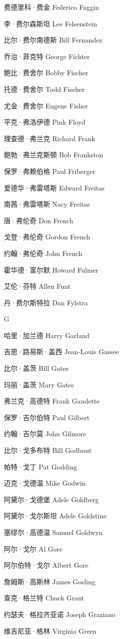 \documentclass[12pt,UTF8]{ctexbook}
\begin{document}
费德里科·费金 Federico Faggin

李·费尔森斯坦 Lee Felsenstein

比尔·费尔南德斯 Bill Fernandez

乔治·菲克特 George Fichter

鲍比·费舍尔 Bobby Fischer

托德·费舍尔 Todd Fischer

尤金·费舍尔 Eugene Fisher

平克·弗洛伊德 Pink Floyd

理查德·弗兰克 Richard Frank

鲍勃·弗兰克斯顿 Bob Frankston

保罗·弗赖伯格 Paul Friberger

爱德华·弗雷塔斯 Edward Freitas

南茜·弗雷塔斯 Nacy Freitas

唐·弗伦奇 Don French

戈登·弗伦奇 Gordon French

约翰·弗伦奇 John French

霍华德·富尔默 Howard Fulmer

艾伦·芬特 Allen Funt

丹·费尔斯特拉 Dan Fylstra

G

哈里·加兰德 Harry Garland

吉恩·路易斯·盖西 Jean-Louis Gassee

比尔·盖茨 Bill Gates

玛丽·盖茨 Mary Gates

弗兰克·高德特 Frank Gaudette

保罗·吉尔伯特 Paul Gilbert

约翰·吉尔莫 John Gilmore

比尔·戈多布特 Bill Godbout

帕特·戈丁 Pat Godding

迈克·戈德温 Mike Godwin

阿黛尔·戈德堡 Adele Goldberg

阿黛尔·戈尔斯坦 Adele Goldstine

塞缪尔·高德温 Samuel Goldwyn

阿尔·戈尔 Al Gore

阿尔伯特·戈尔 Albert Gore

詹姆斯·高斯林 James Gosling

查克·格兰特 Chuck Grant

约瑟夫·格拉齐亚诺 Joseph Graziano

维吉尼亚·格林 Virginia Green
\end{document}
